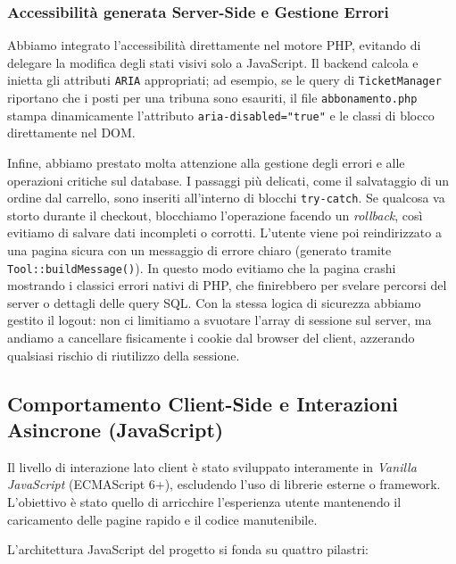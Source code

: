 \documentclass[11pt,a4paper]{article}
\begin{document}
\subsubsection{Accessibilità generata Server-Side e Gestione Errori}
Abbiamo integrato l'accessibilità direttamente nel motore PHP, evitando di delegare la modifica degli stati visivi solo a JavaScript. Il backend calcola e inietta gli attributi \texttt{ARIA} appropriati; ad esempio, se le query di \texttt{TicketManager} riportano che i posti per una tribuna sono esauriti, il file \texttt{abbonamento.php} stampa dinamicamente l'attributo \texttt{aria-disabled="true"} e le classi di blocco direttamente nel DOM.

Infine, abbiamo prestato molta attenzione alla gestione degli errori e alle operazioni critiche sul database. I passaggi più delicati, come il salvataggio di un ordine dal carrello, sono inseriti all'interno di blocchi \texttt{try-catch}. Se qualcosa va storto durante il checkout, blocchiamo l'operazione facendo un \textit{rollback}, così evitiamo di salvare dati incompleti o corrotti. L'utente viene poi reindirizzato a una pagina sicura con un messaggio di errore chiaro (generato tramite \texttt{Tool::buildMessage()}). In questo modo evitiamo che la pagina crashi mostrando i classici errori nativi di PHP, che finirebbero per svelare percorsi del server o dettagli delle query SQL. Con la stessa logica di sicurezza abbiamo gestito il logout: non ci limitiamo a svuotare l'array di sessione sul server, ma andiamo a cancellare fisicamente i cookie dal browser del client, azzerando qualsiasi rischio di riutilizzo della sessione.
\subsection{Comportamento Client-Side e Interazioni Asincrone (JavaScript)}

Il livello di interazione lato client è stato sviluppato interamente in \textit{Vanilla JavaScript} (ECMAScript 6+), escludendo l'uso di librerie esterne o framework. L'obiettivo è stato quello di arricchire l'esperienza utente mantenendo il caricamento delle pagine rapido e il codice manutenibile. 

L'architettura JavaScript del progetto si fonda su quattro pilastri:
\end{document}
